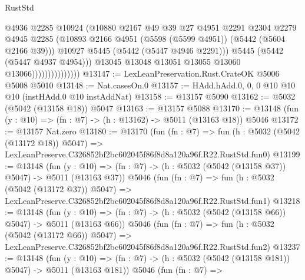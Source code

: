 \begin{lexlean}{RustStd}
\begin{coremodule}
                                    @4936
                                    @2285
                                    @10924
                                    (@10880
                                      @2167
                                      @49
                                      @39
                                      @27
                                      @4951
                                      @2291
                                      @2304
                                      @2279
                                      @4945
                                      @2285
                                      (@10893
                                        @2166
                                        @4951
                                        (@5598 (@5599 @4951))
                                        (@5442 (@5604 @2166 @39)))
                                      @10927
                                      @5445
                                      (@5442 (@5447 @4946 @2291)))
                                    @5445
                                    (@5442 (@5447 @4937 @4954)))
                                  @13045
                                  @13048
                                  @13051
                                  @13055
                                  @13060
                                  @13066)))))))))))))))
@13147 := LexLeanPreservation.Rust.CrateOK @5006 @5008 @5010
@13148 := Nat.casesOn.{0}
@13157 := HAdd.hAdd.{0, 0, 0} @10 @10 @10 (instHAdd.{0} @10 instAddNat)
@13158 := @13157 @5090
@13162 := @5032 (@5042 (@13158 @18)) @5047
@13163 := @13157 @5088
@13170 := @13148 (fun (y : @10) => (fn : @7) -> (h : @13162) -> @5011 (@13163 @18)) @5046
@13172 := @13157 Nat.zero
@13180 := @13170
    (fun (fn : @7) =>
    fun (h : @5032 (@5042 (@13172 @18)) @5047) =>
    LexLeanPreserve.C326852bf2bc602045f86f8d8a120a96f.R22.RustStd.fun0)
@13199 := @13148
    (fun (y : @10) => (fn : @7) -> (h : @5032 (@5042 (@13158 @37)) @5047) -> @5011 (@13163 @37))
    @5046
    (fun (fn : @7) =>
    fun (h : @5032 (@5042 (@13172 @37)) @5047) =>
    LexLeanPreserve.C326852bf2bc602045f86f8d8a120a96f.R22.RustStd.fun1)
@13218 := @13148
    (fun (y : @10) => (fn : @7) -> (h : @5032 (@5042 (@13158 @66)) @5047) -> @5011 (@13163 @66))
    @5046
    (fun (fn : @7) =>
    fun (h : @5032 (@5042 (@13172 @66)) @5047) =>
    LexLeanPreserve.C326852bf2bc602045f86f8d8a120a96f.R22.RustStd.fun2)
@13237 := @13148
    (fun (y : @10) => (fn : @7) -> (h : @5032 (@5042 (@13158 @181)) @5047) -> @5011 (@13163 @181))
    @5046
    (fun (fn : @7) =>

\end{coremodule}
\end{lexlean}
